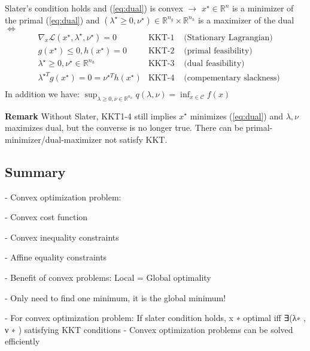 \begin{theorem}
	Slater's condition holds
	and (\ref{eq:dual}) is convex
	$\rightarrow$
	$x^\star \in \mathbb{R}^{n}$ is a minimizer of the primal (\ref{eq:dual})
	and $(\lambda^\star \ge 0,\nu^\star) \in \mathbb{R}^{n_g}\times\mathbb{R}^{n_h}$ is a maximizer of the dual
	$\Leftrightarrow$
	$$\begin{aligned}
			 & \nabla_x\mathcal{L}(x^\star,\lambda^\star,\nu^\star)=0
			 & \text{KKT-1 }
			 & \text{(Stationary Lagrangian)}
			\\
			 & g(x^\star)\le0, h(x^\star)=0
			 & \text{KKT-2 }
			 & \text{(primal feasibility)}
			\\
			 & \lambda^\star\ge0, \nu^\star \in \mathbb{R}^{n_h}
			 & \text{KKT-3 }
			 & \text{(dual feasibility)}
			\\
			 & \lambda^{\star T} g(x^\star)=0=\nu^{\star T} h(x^\star)
			 & \text{KKT-4 }
			 & \text{(compementary slackness)}
			\\
		\end{aligned}$$
	In addition we have:
	$\sup_{\lambda\ge0,\nu\in\mathbb{R}^{n_h}}q(\lambda,\nu)=\inf_{x\in\mathcal{C}}f(x)$
\end{theorem}

\textbf{Remark} Without Slater,
KKT1-4 still implies $x^\star$ minimizes (\ref{eq:dual})
and $\lambda,\nu$ maximizes dual,
but the converse is no longer true.
There can be primal-minimizer/dual-maximizer not satisfy KKT.



\subsection{Summary}

- Convex optimization problem:

- Convex cost function

- Convex inequality constraints

- Affine equality constraints

- Benefit of convex problems: Local = Global optimality

- Only need to find one minimum, it is the global minimum!

- For convex optimization problem: If slater condition holds,
x ∗ optimal iff ∃(λ∗ , ν ∗ ) satisfying KKT conditions
- Convex optimization problems can be solved efficiently

